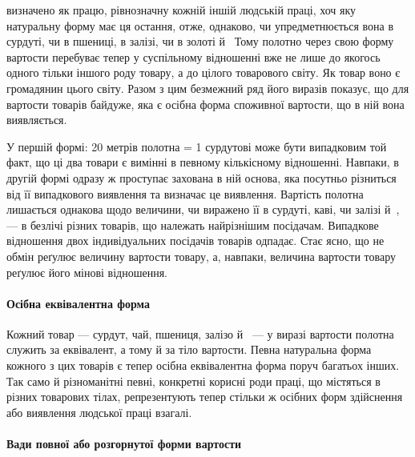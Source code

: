 \parcont{}  %
визначено як працю, рівнозначну кожній іншій людській праці,
хоч яку натуральну форму має ця остання, отже, однаково, чи
упредметнюється вона в сурдуті, чи в пшениці, в залізі, чи в
золоті й~ Тому полотно через свою форму вартости перебуває
тепер у суспільному відношенні вже не лише до якогось одного
тільки іншого роду товару, а до цілого товарового світу. Як
товар воно є громадянин цього світу. Разом з цим безмежний ряд
його виразів показує, що для вартости товарів байдуже, яка є
осібна форма споживної вартости, що в ній вона виявляється.

У першій формі: 20 метрів полотна = 1 сурдутові може бути
випадковим той факт, що ці два товари є вимінні в певному кількісному
відношенні. Навпаки, в другій формі одразу ж проступає
захована в ній основа, яка посутньо різниться від її випадкового
виявлення та визначає це виявлення. Вартість полотна лишається
однакова щодо величини, чи виражено її в сурдуті, каві, чи
залізі й~, — в безлічі різних товарів, що належать найрізнішим
посідачам. Випадкове відношення двох індивідуальних посідачів
товарів одпадає. Стає ясно, що не обмін реґулює величину
вартости товару, а, навпаки, величина вартости товару реґулює
його мінові відношення.

\paragraph{Осібна еквівалентна форма}

Кожний товар — сурдут, чай, пшениця, залізо й~ — у
виразі вартости полотна служить за еквівалент, а тому й за тіло
вартости. Певна натуральна форма кожного з цих товарів є тепер
осібна еквівалентна форма поруч багатьох інших. Так само й
різноманітні певні, конкретні корисні роди праці, що містяться
в різних товарових тілах, репрезентують тепер стільки ж осібних
форм здійснення або виявлення людської праці взагалі.

\paragraph{Вади повної або розгорнутої форми вартости}

